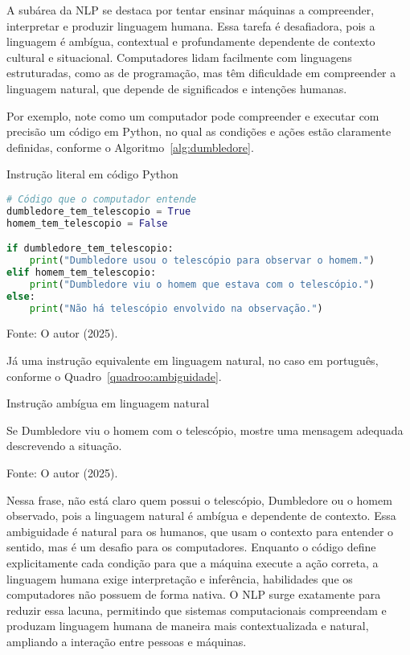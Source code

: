 A subárea da NLP se destaca por tentar ensinar máquinas a compreender, interpretar e produzir linguagem humana. Essa tarefa é desafiadora, pois a linguagem é ambígua, contextual e profundamente dependente de contexto cultural e situacional. Computadores lidam facilmente com linguagens estruturadas, como as de programação, mas têm dificuldade em compreender a linguagem natural, que depende de significados e intenções humanas.

Por exemplo, note como um computador pode compreender e executar com precisão um código em Python, no qual as condições e ações estão claramente definidas, conforme o Algoritmo~\ref{alg:dumbledore}.
\begin{algorithm}[H]
\centering
\caption{Instrução literal em código Python}
\vspace{0.5em}
\begin{lstlisting}[language=Python, style=input]
# Código que o computador entende
dumbledore_tem_telescopio = True
homem_tem_telescopio = False

if dumbledore_tem_telescopio:
    print("Dumbledore usou o telescópio para observar o homem.")
elif homem_tem_telescopio:
    print("Dumbledore viu o homem que estava com o telescópio.")
else:
    print("Não há telescópio envolvido na observação.")
\end{lstlisting}
\caption*{Fonte: O autor (2025).}
\label{alg:dumbledore}
\end{algorithm}
\vspace{-0.5em}
Já uma instrução equivalente em linguagem natural, no caso em português, conforme o Quadro~\ref{quadroo:ambiguidade}.
\begin{quadroo}[H]
\centering
\caption{Instrução ambígua em linguagem natural}
\begin{tcolorbox}[
  colback=yellow!20, 
  colframe=black,
  width=0.8\linewidth,   %
  left=0pt,               %
  boxsep=2mm,
  enlarge left by=-0.02\linewidth  %
]
Se Dumbledore viu o homem com o telescópio, mostre uma mensagem adequada descrevendo a situação.
\end{tcolorbox}
\caption*{Fonte: O autor (2025).}
\label{quadroo:ambiguidade}
\end{quadroo}
\vspace{-0.5em}
Nessa frase, não está claro quem possui o telescópio, Dumbledore ou o homem observado, pois a linguagem natural é ambígua e dependente de contexto. Essa ambiguidade é natural para os humanos, que usam o contexto para entender o sentido, mas é um desafio para os computadores.
Enquanto o código define explicitamente cada condição para que a máquina execute a ação correta, a linguagem humana exige interpretação e inferência, habilidades que os computadores não possuem de forma nativa.
O NLP surge exatamente para reduzir essa lacuna, permitindo que sistemas computacionais compreendam e produzam linguagem humana de maneira mais contextualizada e natural, ampliando a interação entre pessoas e máquinas.

